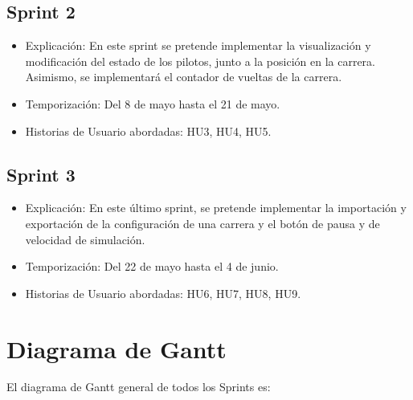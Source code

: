 \newpage

\subsection{Sprint 2}

\begin{itemize}
    \item Explicación: En este sprint se pretende implementar la visualización y modificación del estado de los pilotos, junto a la posición en la carrera. Asimismo, se implementará el contador de vueltas de la carrera.
    \item Temporización: Del 8 de mayo hasta el 21 de mayo.
    \item Historias de Usuario abordadas: HU3, HU4, HU5.
\end{itemize}

\subsection{Sprint 3}

\begin{itemize}
    \item Explicación: En este último sprint, se pretende implementar la importación y exportación de la configuración de una carrera y el botón de pausa y de velocidad de simulación.
    \item Temporización: Del 22 de mayo hasta el 4 de junio.
    \item Historias de Usuario abordadas: HU6, HU7, HU8, HU9.
\end{itemize}

\section{Diagrama de Gantt}

El diagrama de Gantt general de todos los Sprints es:


\begin{center}
\end{center}


